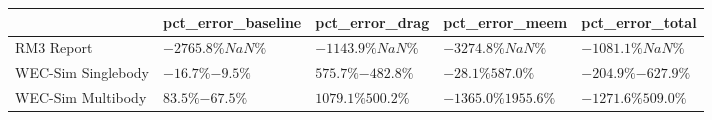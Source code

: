 \begin{tabular}{lllll}
& pct_error_baseline & pct_error_drag & pct_error_meem & pct_error_total\\ 
\hline 
RM3 Report & $-2765.8\% $$NaN\% $ & $-1143.9\% $$NaN\% $ & $-3274.8\% $$NaN\% $ & $-1081.1\% $$NaN\% $ \\ 
WEC-Sim Singlebody & $-16.7\% $$-9.5\% $ & $575.7\% $$-482.8\% $ & $-28.1\% $$587.0\% $ & $-204.9\% $$-627.9\% $ \\ 
WEC-Sim Multibody & $83.5\% $$-67.5\% $ & $1079.1\% $$500.2\% $ & $-1365.0\% $$1955.6\% $ & $-1271.6\% $$509.0\% $ \\ 
\end{tabular}